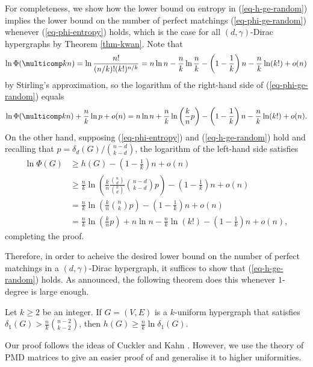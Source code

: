 \documentclass[11pt]{article}
\begin{document}
For completeness, we show how the lower bound on entropy in (\ref{eq-h-ge-random}) implies the lower bound on the number of perfect matchings (\ref{eq-phi-ge-random}) whenever (\ref{eq-phi-entropy}) holds, which is the case for all $(d,\gamma)$-Dirac hypergraphs by Theorem \ref{thm-kwan}. Note that
$$\ln\Phi(\multicomp kn) =\ln \frac{n!}{(n/k)!(k!)^{n/k}}=n\ln n - \frac{n}{k}\ln\frac{n}{k}-\left(1-\frac{1}{k}\right)n-\frac{n}{k}\ln(k!)+o(n)$$
by Stirling's approximation, so the logarithm of the right-hand side of (\ref{eq-phi-ge-random}) equals
$$\ln\Phi(\multicomp kn)+\frac{n}{k}\ln p+o(n)=n\ln n+\frac{n}{k}\ln\left(\frac{k}{n}p\right)-\left(1-\frac{1}{k}\right)n -\frac{n}{k}\ln(k!)+o(n).$$
On the other hand, supposing (\ref{eq-phi-entropy}) and (\ref{eq-h-ge-random}) hold and recalling that $p=\delta_d(G)/\binom{n-d}{k-d}$, the logarithm of the left-hand side satisfies
\begin{align*} 
    \ln\Phi(G) &\ge h(G)-\left(1-\frac{1}{k }\right)n+o(n) \\
    &\ge \frac{n}{k}\ln\left(\frac{k }{n }\frac{\binom{n }{d}}{\binom{k}{d}}\binom{n-d}{k-d}p\right)-\left(1-\frac{1}{k }\right)n+o(n) \\
    &=\frac{n }{k }\ln\left(\frac{k }{n }\binom{n}{k}p\right)-\left(1-\frac{1}{k }\right)n+o(n) \\
    &= \frac{n }{k }\ln\left(\frac{k }{n }p\right)+n\ln n -\frac{n}{k}\ln(k!)-\left(1-\frac{1}{k }\right)n+o(n),
\end{align*}
completing the proof.

Therefore, in order to acheive the desired lower bound on the number of perfect matchings in a $(d,\gamma)$-Dirac hypergraph, it suffices to show that (\ref{eq-h-ge-random}) holds. As announced, the following theorem does this whenever $1$-degree is large enough.

\begin{theorem}\label{thm-1-deg}
    Let $k\ge2$ be an integer. If $G=(V,E)$ is a $k$-uniform hypergraph that satisfies $\delta_1(G)> \frac{n}{k}\binom{n-2}{k-2}$, then $h(G)\ge \frac{n}{k}\ln{\delta_1(G)}$.
\end{theorem}

Our proof follows the ideas of Cuckler and Kahn \cite[Theorem 1.3]{cuckler2009hamiltonian}. However, we use the theory of PMD matrices to give an easier proof of \cite[(24)]{cuckler2009hamiltonian} and generalise it to higher uniformities.
\end{document}
